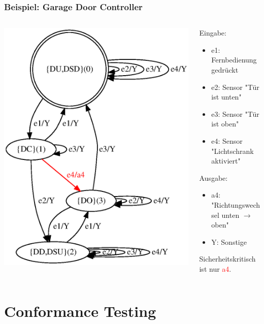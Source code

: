 \documentclass[10pt]{beamer}
\begin{document}
\begin{frame}
\frametitle{Beispiel: Garage Door Controller}
\begin{columns}[T] %
\begin{column}{.53\textwidth}

\includegraphics[width=\textwidth]{images/gdc_abs_min_colored}
\end{column}%
\hfill%
\begin{column}{.55\textwidth}
Eingabe:
\begin{itemize}
  \item e1: Fernbedienung gedrückt
  \item e2: Sensor "Tür ist unten"
  \item e3: Sensor "Tür ist oben"
  \item e4: Sensor "Lichtschrank aktiviert"
\end{itemize}
Ausgabe:
\begin{itemize}
  \item a4: "Richtungswechsel unten $\rightarrow$ oben"
  \item Y: Sonstige
\end{itemize}
Sicherheitskritisch ist nur \textcolor{red}{a4}.
\end{column}%
\end{columns}
\end{frame}

\section{Conformance Testing}
\end{document}
